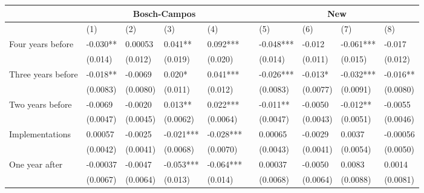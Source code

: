 \begin{tabular}{lrlrlrrlrl}
\toprule
      & \multicolumn{4}{c}{Bosch-Campos} &       & \multicolumn{4}{c}{New} \\
\midrule
\midrule
      & \multicolumn{1}{l}{(1)} & (2)   & \multicolumn{1}{l}{(3)} & (4)   &       & \multicolumn{1}{l}{(5)} & (6)   & \multicolumn{1}{l}{(7)} & (8) \\
Four years before & \multicolumn{1}{l}{-0.030**} & 0.00053 & \multicolumn{1}{l}{0.041**} & 0.092*** &       & \multicolumn{1}{l}{-0.048***} & -0.012 & \multicolumn{1}{l}{-0.061***} & -0.017 \\
      & \multicolumn{1}{l}{(0.014)} & (0.012) & \multicolumn{1}{l}{(0.019)} & (0.020) &       & \multicolumn{1}{l}{(0.014)} & (0.011) & \multicolumn{1}{l}{(0.015)} & (0.012) \\
Three years before & \multicolumn{1}{l}{-0.018**} & -0.0069 & \multicolumn{1}{l}{0.020*} & 0.041*** &       & \multicolumn{1}{l}{-0.026***} & -0.013* & \multicolumn{1}{l}{-0.032***} & -0.016** \\
      & \multicolumn{1}{l}{(0.0083)} & (0.0080) & \multicolumn{1}{l}{(0.011)} & (0.012) &       & \multicolumn{1}{l}{(0.0083)} & (0.0077) & \multicolumn{1}{l}{(0.0091)} & (0.0080) \\
Two years before & \multicolumn{1}{l}{-0.0069} & -0.0020 & \multicolumn{1}{l}{0.013**} & 0.022*** &       & \multicolumn{1}{l}{-0.011**} & -0.0050 & \multicolumn{1}{l}{-0.012**} & -0.0055 \\
      & \multicolumn{1}{l}{(0.0047)} & (0.0045) & \multicolumn{1}{l}{(0.0062)} & (0.0064) &       & \multicolumn{1}{l}{(0.0047)} & (0.0043) & \multicolumn{1}{l}{(0.0051)} & (0.0046) \\
Implementations & \multicolumn{1}{l}{0.00057} & -0.0025 & \multicolumn{1}{l}{-0.021***} & -0.028*** &       & \multicolumn{1}{l}{0.00065} & -0.0029 & \multicolumn{1}{l}{0.0037} & -0.00056 \\
      & \multicolumn{1}{l}{(0.0042)} & (0.0041) & \multicolumn{1}{l}{(0.0068)} & (0.0070) &       & \multicolumn{1}{l}{(0.0043)} & (0.0041) & \multicolumn{1}{l}{(0.0054)} & (0.0050) \\
One year after & \multicolumn{1}{l}{-0.00037} & -0.0047 & \multicolumn{1}{l}{-0.053***} & -0.064*** &       & \multicolumn{1}{l}{0.00037} & -0.0050 & \multicolumn{1}{l}{0.0083} & 0.0014 \\
      & \multicolumn{1}{l}{(0.0067)} & (0.0064) & \multicolumn{1}{l}{(0.013)} & (0.014) &       & \multicolumn{1}{l}{(0.0068)} & (0.0064) & \multicolumn{1}{l}{(0.0088)} & (0.0081) \\

\end{tabular}
